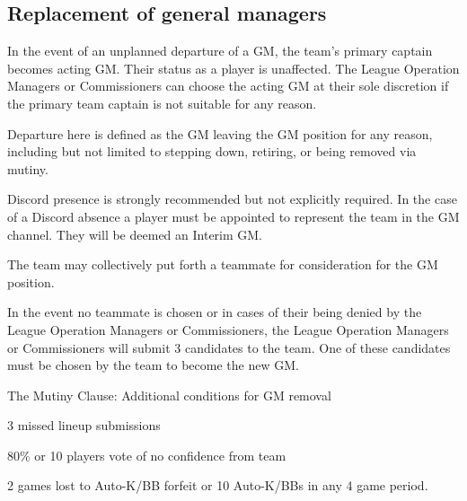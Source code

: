 \subsection{Replacement of general managers}
\begin{deepEnumerate}
	\item In the event of an unplanned departure of a GM, the team's primary captain becomes acting GM.	Their status as a player is unaffected.
	The League Operation Managers or Commissioners can choose the acting GM at their sole discretion if the primary team captain is not suitable for any reason.
	\begin{deepEnumerate}
		\item Departure here is defined as the GM leaving the GM position for any reason, including but not limited to stepping down, retiring, or being removed via mutiny.
		\begin{deepEnumerate}
			\item Discord presence is strongly recommended but not explicitly required.	In the case of a Discord absence a player must be appointed
			to represent the team in the GM channel. They will be deemed an Interim GM.
		\end{deepEnumerate}
	\end{deepEnumerate}
	\item The team may collectively put forth a teammate for consideration for the GM position.
	\item In the event no teammate is chosen or in cases of their being denied by the League Operation Managers or Commissioners,
	the League Operation Managers or Commissioners will submit 3 candidates to the team. One of these candidates must be chosen by the team to become the new GM.
	\item The Mutiny Clause: Additional conditions for GM removal
	\begin{deepEnumerate}
		\item 3 missed lineup submissions
		\item 80\% or 10 players vote of no confidence from team
		\item 2 games lost to Auto-K/BB forfeit or 10 Auto-K/BBs in any 4 game period.
	\end{deepEnumerate}
\end{deepEnumerate}

